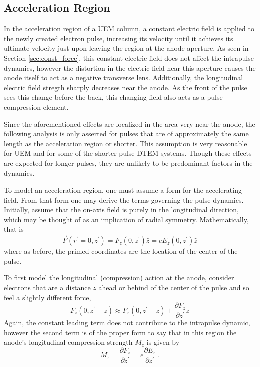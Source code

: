 \subsection{Acceleration Region} \label{sec:gun_model}

In the acceleration region of a UEM column, a constant electric field is applied to the newly created electron pulse, increasing its velocity until it achieves its ultimate velocity just upon leaving the region at the anode aperture.
As seen in Section \ref{sec:const_force}, this constant electric field does not affect the intrapulse dynamics, however the distortion in the electric field near this aperture causes the anode itself to act as a negative transverse lens. %
Additionally, the longitudinal electric field stregth sharply decreases near the anode.
As the front of the pulse sees this change before the back, this changing field also acts as a pulse compression element.

Since the aforementioned effects are localized in the area very near the anode, the following analysis is only asserted for pulses that are of approximately the same length as the acceleration region or shorter.
This assumption is very reasonable for UEM and for some of the shorter-pulse DTEM systems.
Though these effects are expected for longer pulses, they are unlikely to be predominant factors in the dynamics.

To model an acceleration region, one must assume a form for the accelerating field.
From that form one may derive the terms governing the pulse dynamics. Initially, assume that the on-axis field is purely in the longitudinal direction, which may be thought of as an implication of radial symmetry.
Mathematically, that is
\begin{equation}
  \vec{F}(r^{\prime}=0,z^{\prime}) = F_z (0,z^{\prime}) \hat{z} = e E_z (0,z^{\prime}) \hat{z}
\end{equation}
where as before, the primed coordinates are the location of the center of the pulse.

To first model the longitudinal (compression) action at the anode, %
consider electrons that are a distance $z$ ahead or behind of the center of the pulse and so feel a slightly different force, 
\begin{equation}
  F_z(0,z^{\prime} - z) \approx F_z(0,z^{\prime} - z) + \frac{\partial F_z}{\partial z^{\prime}} z
\end{equation}
Again, the constant leading term does not contribute to the intrapulse dynamic, however the second term is of the proper form to say that in this region the anode's longitudinal compression strength $M_z$ is given by
\begin{equation}
  M_z = \frac{\partial F_z}{\partial z^{\prime}} = e \frac{\partial E_z}{\partial z^{\prime}} \, \text{.}
\end{equation}

